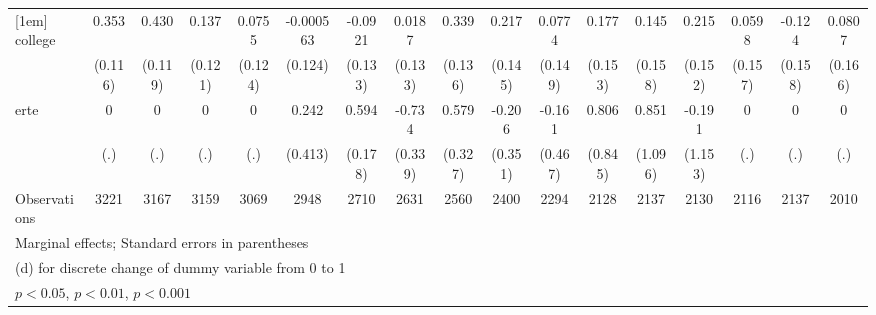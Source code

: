 {\begin{tabular}{l*{16}{c}}
[1em]
college             &       0.353\sym{**} &       0.430\sym{***}&       0.137         &      0.0755         &   -0.000563         &     -0.0921         &      0.0187         &       0.339\sym{*}  &       0.217         &      0.0774         &       0.177         &       0.145         &       0.215         &      0.0598         &      -0.124         &      0.0807         \\
                    &     (0.116)         &     (0.119)         &     (0.121)         &     (0.124)         &     (0.124)         &     (0.133)         &     (0.133)         &     (0.136)         &     (0.145)         &     (0.149)         &     (0.153)         &     (0.158)         &     (0.152)         &     (0.157)         &     (0.158)         &     (0.166)         \\
[1em]
erte                &           0         &           0         &           0         &           0         &       0.242         &       0.594\sym{***}&      -0.734\sym{*}  &       0.579         &      -0.206         &      -0.161         &       0.806         &       0.851         &      -0.191         &           0         &           0         &           0         \\
                    &         (.)         &         (.)         &         (.)         &         (.)         &     (0.413)         &     (0.178)         &     (0.339)         &     (0.327)         &     (0.351)         &     (0.467)         &     (0.845)         &     (1.096)         &     (1.153)         &         (.)         &         (.)         &         (.)         \\
\hline
Observations        &        3221         &        3167         &        3159         &        3069         &        2948         &        2710         &        2631         &        2560         &        2400         &        2294         &        2128         &        2137         &        2130         &        2116         &        2137         &        2010         \\
\hline\hline
\multicolumn{17}{l}{\footnotesize Marginal effects; Standard errors in parentheses}\\
\multicolumn{17}{l}{\footnotesize  (d) for discrete change of dummy variable from 0 to 1}\\
\multicolumn{17}{l}{\footnotesize \sym{*} \(p<0.05\), \sym{**} \(p<0.01\), \sym{***} \(p<0.001\)}\\
\end{tabular}
}
